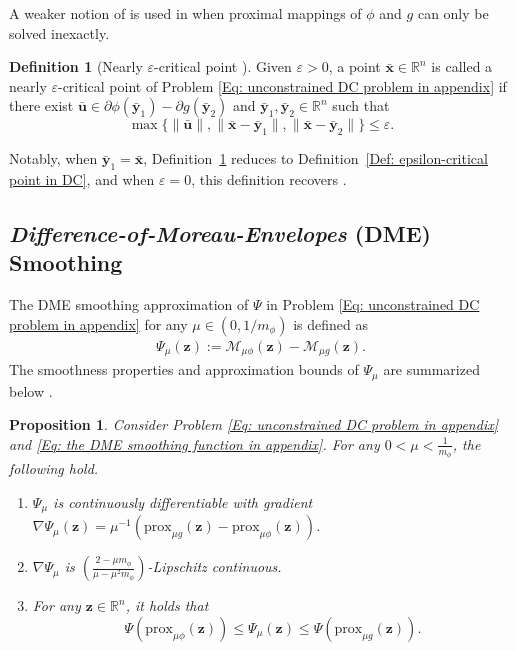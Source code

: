 \documentclass{article}
\theoremstyle{plain}
\newtheorem{proposition}{Proposition}[section]
\theoremstyle{definition}
\newtheorem{definition}{Definition}[section]
\theoremstyle{remark}
\newcommand{\RR}{\mathbb{R}}
\newcommand{\prox}{\mathrm{prox}}
\newcommand{\bx}{\bm{x}}
\newcommand{\bu}{\bm{u}}
\newcommand{\bz}{\bm{z}}
\newcommand{\by}{\bm{y}}
\newcommand{\calM}{\mathcal{M}}
\numberwithin{equation}{section}
\begin{document}
A weaker notion of  is used in \cite{hu2024single,yao2022large} when proximal mappings of $\phi$ and $g$ can only be solved inexactly.
\begin{definition}[Nearly $\varepsilon$-critical point \cite{yao2022large}]
    \label{Def: epsilon-critical point 3} 
    Given $\varepsilon > 0$, a point $\bar{\bx}\in \RR^{n}$ is called a nearly $\varepsilon$-critical point of Problem \eqref{Eq: unconstrained DC problem in appendix} if there exist $\bar{\bu}\in \partial \phi (\bar{\by}_1) - \partial g(\bar{\by}_2)$ and $\bar{\by}_1, \bar{\by}_2 \in \RR^n$ such that
    \begin{equation}
        \label{Eq: epsilon-critical point 3}
        \max \{ \|\bar{\bu}\|, \|\bar{\bx}- \bar{\by}_1\|, \|\bar{\bx}- \bar{\by}_2\| \} \leq \varepsilon.
    \end{equation}
\end{definition}
Notably, when $\bar{\by}_1 = \bar{\bx}$, Definition~\ref{Def: epsilon-critical point 3} reduces to Definition~\ref{Def: epsilon-critical point in DC}, and when $\varepsilon = 0$, this definition recovers .




\subsection{\textit{Difference-of-Moreau-Envelopes} (DME) Smoothing}
\label{Subsection: Difference-of-Moreau-Envelopes}
The DME smoothing approximation of \(\Psi\) in Problem \eqref{Eq: unconstrained DC problem in appendix} for any $\mu \in (0, 1/m_{\phi})$ is defined as
\begin{align}
\label{Eq: the DME smoothing function in appendix}
 \Psi_{\mu}(\bz) := \calM_{\mu \phi}(\bz) - \calM_{\mu g}(\bz).
\end{align}
The smoothness properties and approximation bounds of $\Psi_{\mu}$ are summarized below \cite{hiriart1991regularize}.
\begin{proposition}
\label{Prop: smoothness of DME}
Consider Problem \eqref{Eq: unconstrained DC problem in appendix} and \eqref{Eq: the DME smoothing function in appendix}. For any \(0 < \mu < \frac{1}{m_\phi}\), the following hold.
 \begin{enumerate}
 \item[(i)] \(\Psi_{\mu}\) is continuously differentiable with gradient \( \nabla \Psi_{\mu}(\bz) = \mu^{-1} (\prox_{\mu g}(\bz) - \prox_{\mu \phi}(\bz))\).
 
 \item[(ii)] \(\nabla \Psi_{\mu}\) is $(\frac{2- \mu m_{\phi}}{\mu - \mu^2 m_{\phi}})$-Lipschitz continuous.

 \item[(iii)] For any $\bz \in \RR^n $, it holds that
 \[
\Psi(\prox_{\mu \phi}(\bz)) \leq \Psi_{\mu}(\bz) \leq \Psi(\prox_{\mu g}(\bz)).\]
 \end{enumerate}
 \end{proposition}
\end{document}

